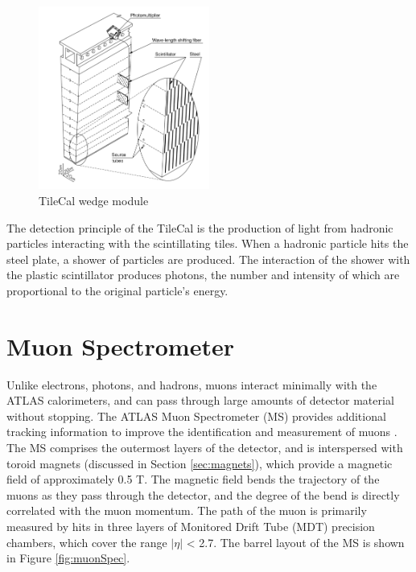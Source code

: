 \begin{figure}
        \centering
	\includegraphics[width=0.5\textwidth]{figures/ch4/tileWedge.png}
	\caption{TileCal wedge module \cite{tile_tdr} }
	\label{fig:tileCal}
\end{figure}

The detection principle of the TileCal is the production of light from hadronic particles interacting with the scintillating tiles. When a hadronic particle hits the steel plate, a shower of particles are produced. The interaction of the shower with the plastic scintillator produces photons, the number and intensity of which are proportional to the original particle's energy. \\

\section{Muon Spectrometer}
Unlike electrons, photons, and hadrons, muons interact minimally with the ATLAS calorimeters, and can pass through large amounts of detector material without stopping. The ATLAS Muon Spectrometer (MS) provides additional tracking information to improve the identification and measurement of muons \cite{muon_tdr}. The MS comprises the outermost layers of the detector, and is interspersed with toroid magnets (discussed in Section \ref{sec:magnets}), which provide a magnetic field of approximately 0.5 T. The magnetic field bends the trajectory of the muons as they pass through the detector, and the degree of the bend is directly correlated with the muon momentum. The path of the muon is primarily measured by hits in three layers of Monitored Drift Tube (MDT) precision chambers, which cover the range $|\eta|$ < 2.7. The barrel layout of the MS is shown in Figure \ref{fig:muonSpec}. \par

